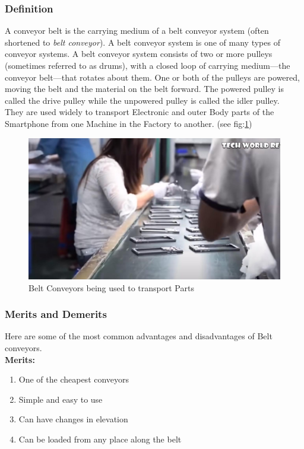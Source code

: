 \documentclass[11pt]{article}
\begin{document}
\subsubsection{Definition}
A conveyor belt is the carrying medium of a belt conveyor system (often shortened to \textit{belt conveyor}). A belt conveyor system is one of many types of conveyor systems. A belt conveyor system consists of two or more pulleys (sometimes referred to as drums), with a closed loop of carrying medium—the conveyor belt—that rotates about them. One or both of the pulleys are powered, moving the belt and the material on the belt forward. The powered pulley is called the drive pulley while the unpowered pulley is called the idler pulley.\\
 
They are used widely to transport Electronic and outer Body parts of the Smartphone from one Machine in the Factory to another. (see fig:\ref{fig:Belt Conveyors})


\begin{figure}[H]
	\centering 
	\includegraphics[scale=0.3]{Belt conveyors.jpg}
	\caption{Belt Conveyors being used to transport Parts\cite{How Smartphones are made in China}}
	\label{fig:Belt Conveyors}
\end{figure}




\subsubsection{Merits and Demerits}
Here are some of the most common advantages and disadvantages of Belt conveyors.\\


\textbf{Merits:}
\begin{enumerate}
	\item One of the cheapest conveyors
	\item Simple and easy to use
	\item Can have changes in elevation
	\item Can be loaded from any place along the belt\\
\end{enumerate}
\end{document}
